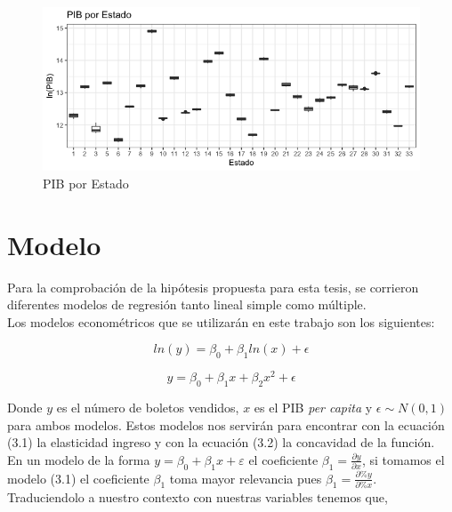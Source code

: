 \begin{figure}[H]
    \centering
    \caption{PIB por Estado}
    \label{fig:box-pib}
    \includegraphics[scale = 0.5]{Imagenes/boxplot_pib.png}
\end{figure}





\newpage

\section{Modelo}

\noindent Para la comprobación de la hipótesis propuesta para esta tesis, se corrieron diferentes modelos de regresión tanto lineal simple como múltiple. \\

Los modelos econométricos que se utilizarán en este trabajo son los siguientes:

\begin{equation}
    ln(y) = \beta_0 + \beta_1 ln(x) + \epsilon
\end{equation}

\begin{equation}
    y = \beta_0 + \beta_1 x + \beta_2 x^2 + \epsilon
\end{equation}
 
Donde $y$ es el número de boletos vendidos, $x$ es el PIB \textit{per capita} y $\epsilon \sim N(0,1)$ para ambos modelos. Estos modelos nos servirán para encontrar con la ecuación (3.1) la elasticidad ingreso y con la ecuación (3.2) la concavidad de la función. \\

En un modelo de la forma $y = \beta_0 + \beta_1 x + \varepsilon$ el coeficiente $\beta_1 = \frac{\partial y}{\partial x}$, si tomamos el modelo (3.1) el coeficiente $\beta_1$ toma mayor relevancia pues $\beta_1 = \frac{\partial \% y}{\partial \% x}$. Traduciendolo a nuestro contexto con nuestras variables tenemos que,

